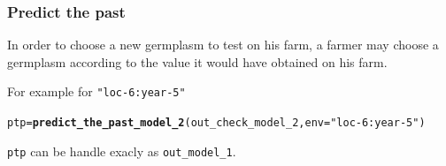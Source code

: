 \documentclass{article}\usepackage[]{graphicx}\usepackage[]{color}
\makeatletter
\newcommand{\hlstr}[1]{\textcolor[rgb]{0.192,0.494,0.8}{#1}}%
\newcommand{\hlstd}[1]{\textcolor[rgb]{0.345,0.345,0.345}{#1}}%
\newcommand{\hlkwb}[1]{\textcolor[rgb]{0.69,0.353,0.396}{#1}}%
\newcommand{\hlkwc}[1]{\textcolor[rgb]{0.333,0.667,0.333}{#1}}%
\newcommand{\hlkwd}[1]{\textcolor[rgb]{0.737,0.353,0.396}{\textbf{#1}}}%
\newenvironment{kframe}{%
 \def\at@end@of@kframe{}%
 \ifinner\ifhmode%
  \def\at@end@of@kframe{\end{minipage}}%
  \begin{minipage}{\columnwidth}%
 \fi\fi%
 \def\FrameCommand##1{\hskip\@totalleftmargin \hskip-\fboxsep
 \colorbox{shadecolor}{##1}\hskip-\fboxsep
     \hskip-\linewidth \hskip-\@totalleftmargin \hskip\columnwidth}%
 \MakeFramed {\advance\hsize-\width
   \@totalleftmargin\z@ \linewidth\hsize
   \@setminipage}}%
 {\par\unskip\endMakeFramed%
 \at@end@of@kframe}
\newenvironment{knitrout}{}{} %
\makeatother
\begin{document}
\subsubsection{Predict the past}

In order to choose a new germplasm to test on his farm, a farmer may choose a germplasm according to the value it would have obtained on his farm.

For example for \texttt{"loc-6:year-5"}
\begin{knitrout}
\color{fgcolor}\begin{kframe}
\begin{alltt}
\hlstd{ptp} \hlkwb{=} \hlkwd{predict_the_past_model_2}\hlstd{(out_check_model_2,} \hlkwc{env} \hlstd{=} \hlstr{"loc-6:year-5"}\hlstd{)}
\end{alltt}
\end{kframe}
\end{knitrout}

\texttt{ptp} can be handle exacly as \texttt{out\_model\_1}.
\end{document}
